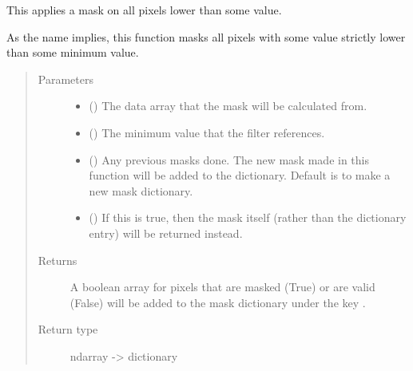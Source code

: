 \documentclass[letterpaper,10pt,english]{sphinxmanual}
\begin{document}
\begin{fulllineitems}
\label{\detokenize{python_docstrings/IfA_Smeargle.echo.masks.masks_echo200:IfA_Smeargle.echo.masks.masks_echo200.echo270_minimum_cut}}
This applies a mask on all pixels lower than some value.

As the name implies, this function masks all pixels with some value
strictly lower than some minimum value.
\begin{quote}\begin{description}
\item[{Parameters}] \leavevmode\begin{itemize}
\item {} 
 () \textendash{} The data array that the mask will be calculated from.

\item {} 
 () \textendash{} The minimum value that the filter references.

\item {} 
 (\sphinxstyleliteralemphasis{\sphinxupquote{ (}}\sphinxstyleliteralemphasis{\sphinxupquote{)}}) \textendash{} Any previous masks done. The new mask made in this function will be
added to the dictionary. Default is to make a new mask dictionary.

\item {} 
 (\sphinxstyleliteralemphasis{\sphinxupquote{ (}}\sphinxstyleliteralemphasis{\sphinxupquote{)}}) \textendash{} If this is true, then the mask itself (rather than the dictionary
entry) will be returned instead.

\end{itemize}

\item[{Returns}] \leavevmode
{} \textendash{} A boolean array for pixels that are masked (True) or are valid (False)
will be added to the mask dictionary under the key
.

\item[{Return type}] \leavevmode
ndarray -\textgreater{} dictionary

\end{description}\end{quote}

\end{fulllineitems}
\end{document}
